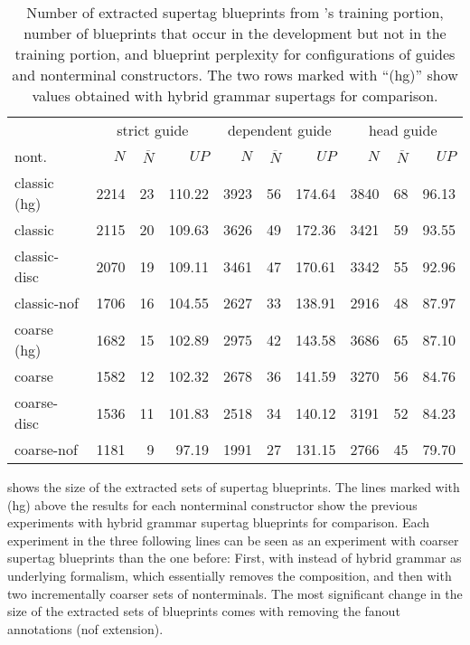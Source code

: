 \documentclass[../../document.tex]{subfiles}
\begin{document}
    \begin{table}
        \caption{\label{tbl:gridsearch:dcp:1}
            Number of extracted  supertag blueprints from \negra{}'s training portion, number of blueprints that occur in the development but not in the training portion, and blueprint perplexity for configurations of guides and nonterminal constructors. The two rows marked with ``(hg)'' show values obtained with hybrid grammar supertags for comparison.
        }
        \centering
        \vspace{.2cm}
        \begin{tabular}{l|rrr|rrr|rrr}
            \toprule
                & \multicolumn{3}{c|}{strict guide} &  \multicolumn{3}{c|}{dependent guide} &  \multicolumn{3}{c}{head guide} \\
nont.           & $N$ & $\overline{N}$ & $\mathit{UP}$ & $N$ & $\overline{N}$ & $\mathit{UP}$ & $N$ & $\overline{N}$ & $\mathit{UP}$ \\ \hline
\rowcolor{black!10}
classic (hg) & 2214 & 23 & 110.22 & 3923 & 56 & 174.64 & 3840 & 68 & 96.13 \\\hline
classic      & 2115 & 20 & 109.63 & 3626 & 49 & 172.36 & 3421 & 59 & 93.55 \\
classic-disc & 2070 & 19 & 109.11 & 3461 & 47 & 170.61 & 3342 & 55 & 92.96 \\
classic-nof  & 1706 & 16 & 104.55 & 2627 & 33 & 138.91 & 2916 & 48 & 87.97 \\  \hline
\rowcolor{black!10}
coarse (hg)  & 1682 & 15 & 102.89 & 2975 & 42 & 143.58 & 3686 & 65 & 87.10 \\\hline
coarse       & 1582 & 12 & 102.32 & 2678 & 36 & 141.59 & 3270 & 56 & 84.76 \\
coarse-disc  & 1536 & 11 & 101.83 & 2518 & 34 & 140.12 & 3191 & 52 & 84.23 \\
coarse-nof   & 1181 & 9  & 97.19  & 1991 & 27 & 131.15 & 2766 & 45 & 79.70 \\
\bottomrule
        \end{tabular}
    \end{table}

     shows the size of the extracted sets of supertag blueprints.
    The lines marked with (hg) above the results for each nonterminal constructor show the previous experiments with hybrid grammar supertag blueprints for comparison.
    Each experiment in the three following lines can be seen as an experiment with coarser supertag blueprints than the one before:
        First, with  instead of hybrid grammar as underlying formalism, which essentially removes the  composition, and then with two incrementally coarser sets of nonterminals.
    The most significant change in the size of the extracted sets of blueprints comes with removing the fanout annotations (nof extension).
\end{document}
